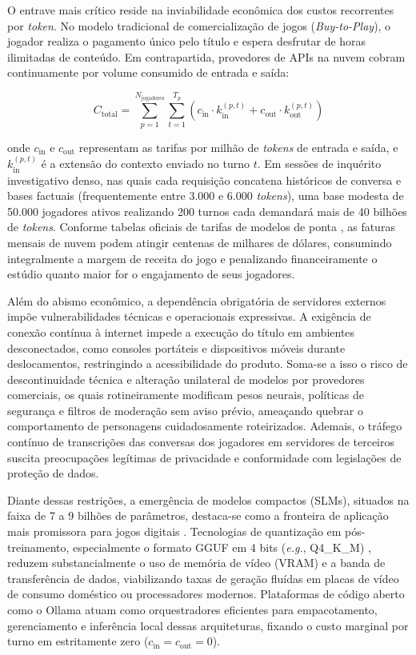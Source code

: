 O entrave mais crítico reside na inviabilidade econômica dos custos recorrentes por \textit{token}. No modelo tradicional de comercialização de jogos (\textit{Buy-to-Play}), o jogador realiza o pagamento único pelo título e espera desfrutar de horas ilimitadas de conteúdo. Em contrapartida, provedores de APIs na nuvem cobram continuamente por volume consumido de entrada e saída:

\begin{equation}
C_{\text{total}} = \sum_{p=1}^{N_{\text{jogadores}}} \sum_{t=1}^{T_p} \left( c_{\text{in}} \cdot k_{\text{in}}^{(p,t)} + c_{\text{out}} \cdot k_{\text{out}}^{(p,t)} \right)
\label{eq:custo_api}
\end{equation}

\noindent onde $c_{\text{in}}$ e $c_{\text{out}}$ representam as tarifas por milhão de \textit{tokens} de entrada e saída, e $k_{\text{in}}^{(p,t)}$ é a extensão do contexto enviado no turno $t$. Em sessões de inquérito investigativo denso, nas quais cada requisição concatena históricos de conversa e bases factuais (frequentemente entre 3.000 e 6.000 \textit{tokens}), uma base modesta de 50.000 jogadores ativos realizando 200 turnos cada demandará mais de 40 bilhões de \textit{tokens}. Conforme tabelas oficiais de tarifas de modelos de ponta \cite{openai2024pricing}, as faturas mensais de nuvem podem atingir centenas de milhares de dólares, consumindo integralmente a margem de receita do jogo e penalizando financeiramente o estúdio quanto maior for o engajamento de seus jogadores.

Além do abismo econômico, a dependência obrigatória de servidores externos impõe vulnerabilidades técnicas e operacionais expressivas. A exigência de conexão contínua à internet impede a execução do título em ambientes desconectados, como consoles portáteis e dispositivos móveis durante deslocamentos, restringindo a acessibilidade do produto. Soma-se a isso o risco de descontinuidade técnica e alteração unilateral de modelos por provedores comerciais, os quais rotineiramente modificam pesos neurais, políticas de segurança e filtros de moderação sem aviso prévio, ameaçando quebrar o comportamento de personagens cuidadosamente roteirizados. Ademais, o tráfego contínuo de transcrições das conversas dos jogadores em servidores de terceiros suscita preocupações legítimas de privacidade e conformidade com legislações de proteção de dados.

Diante dessas restrições, a emergência de modelos compactos (SLMs), situados na faixa de 7 a 9 bilhões de parâmetros, destaca-se como a fronteira de aplicação mais promissora para jogos digitais \cite{cao2026task}. Tecnologias de quantização em pós-treinamento, especialmente o formato GGUF em 4 bits (\textit{e.g.}, Q4\_K\_M) \cite{gerganov2023llamacpp,dettmers2023qlora}, reduzem substancialmente o uso de memória de vídeo (VRAM) e a banda de transferência de dados, viabilizando taxas de geração fluídas em placas de vídeo de consumo doméstico ou processadores modernos. Plataformas de código aberto como o Ollama \cite{ollama2023runtime} atuam como orquestradores eficientes para empacotamento, gerenciamento e inferência local dessas arquiteturas, fixando o custo marginal por turno em estritamente zero ($c_{\text{in}} = c_{\text{out}} = 0$).

